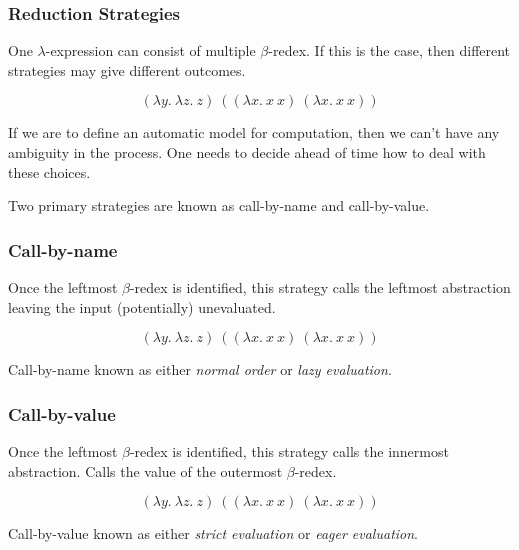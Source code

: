 \documentclass{beamer}
\begin{document}
\begin{frame}
	\frametitle{Reduction Strategies}

	One $\lambda$-expression can consist of multiple $\beta$-redex. If this is the case, then different strategies may give different outcomes. 

	$$(\lambda y. \ \lambda z. \ z) \ ((\lambda x. \ x \ x) \ (\lambda x. \ x \ x))$$

	\vspace{2cm}

	If we are to define an automatic model for computation, then we can't have any ambiguity in the process. One needs to decide ahead of time how to deal with these choices. 
	
	Two primary strategies are known as call-by-name and call-by-value.

\end{frame}

\begin{frame}
	\frametitle{Call-by-name}

	Once the leftmost $\beta$-redex is identified, this strategy calls the leftmost abstraction leaving the input (potentially) unevaluated.

	$$(\lambda y. \ \lambda z. \ z) \ ((\lambda x. \ x \ x) \ (\lambda x. \ x \ x))$$

	\vspace{4.5cm}
	
	Call-by-name known as either \emph{normal order} or \emph{lazy evaluation}.

\end{frame}

\begin{frame}
	\frametitle{Call-by-value}

	Once the leftmost $\beta$-redex is identified, this strategy calls the innermost abstraction. Calls the value of the outermost $\beta$-redex. 

	$$(\lambda y. \ \lambda z. \ z) \ ((\lambda x. \ x \ x) \ (\lambda x. \ x \ x))$$

	\vspace{4.5cm}
	
	Call-by-value known as either \emph{strict evaluation} or \emph{eager evaluation}.

\end{frame}
\end{document}
